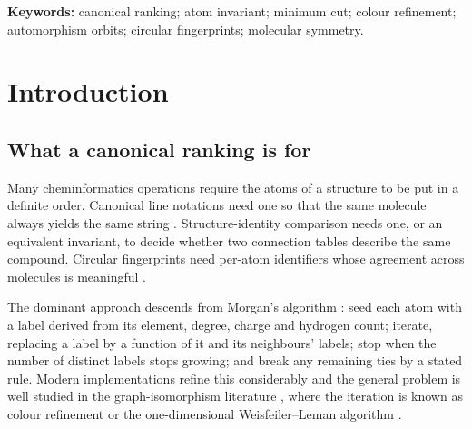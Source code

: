 \documentclass[11pt,twocolumn,a4paper]{article}
\theoremstyle{crthm}
\theoremstyle{definition}
\theoremstyle{remark}
\begin{document}
\begin{abstract}
We state the limitations plainly. The construction is an invariant, not a
canonical form: it does not produce a total order and cannot be used
directly as a canonical labelling. Its refinement is a colour refinement
and inherits that family's known incompleteness on strongly regular
graphs. It is more expensive than Morgan by a factor of the maximum-flow
cost. And the corpus is small and hand-assembled. What the construction
provides is a label whose equality is a fact about the molecule rather
than about the labelling procedure, together with the burial depth, a
quantity the conventional atom identifier does not carry.
\end{abstract}

\noindent\textbf{Keywords:} canonical ranking; atom invariant; minimum
cut; colour refinement; automorphism orbits; circular fingerprints;
molecular symmetry.

\tableofcontents

\section{Introduction}
\label{sec:intro}

\subsection{What a canonical ranking is for}

Many cheminformatics operations require the atoms of a structure to be
put in a definite order. Canonical line notations need one so that the
same molecule always yields the same string \citep{weininger1989}.
Structure-identity comparison needs one, or an equivalent invariant, to
decide whether two connection tables describe the same compound. Circular
fingerprints need per-atom identifiers whose agreement across molecules is
meaningful \citep{rogers2010,glen2006}.

The dominant approach descends from Morgan's algorithm \citep{morgan1965}:
seed each atom with a label derived from its element, degree, charge and
hydrogen count; iterate, replacing a label by a function of it and its
neighbours' labels; stop when the number of distinct labels stops growing;
and break any remaining ties by a stated rule. Modern implementations
refine this considerably \citep{schneider2015,figueras1993} and the
general problem is well studied in the graph-isomorphism literature
\citep{mckay1981,mckay2014,babai2016}, where the iteration is known as
colour refinement or the one-dimensional Weisfeiler--Leman algorithm
\citep{weisfeiler1968,arvind2015}.
\end{document}
